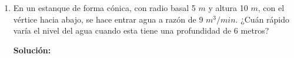 \documentclass[12pt]{article}
\newenvironment{solucion}
{\begin{mdframed}[backgroundcolor=black!10]
		{\bf Solución:}\\
	}
	{
	\end{mdframed}
}
\newenvironment{preguntas}
{\begin{enumerate}\itemsep12pt
	}
	{
	\end{enumerate}
}
\begin{document}
\begin{preguntas}
\begin{solucion}
\begin{enumerate}[a)]
\item 
\end{enumerate}
\end{solucion}
\item En un estanque de forma cónica, con radio basal 5 $m$ y altura 10 $m$, con el vértice hacia abajo, se hace entrar agua a razón de 9 $m^3/min$. ¿Cuán rápido varía el nivel del agua cuando esta tiene una profundidad de 6 metros?
\begin{solucion}

\end{solucion}
\end{preguntas}
\end{document}
